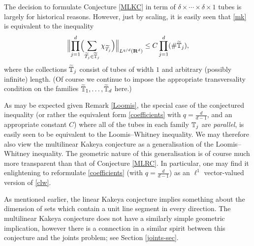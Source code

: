 \begin{remark}
The decision to formulate Conjecture \ref{MLKC} in term of
$\delta\times\cdots\times\delta\times 1$ tubes is largely for
historical reasons. However, just by scaling, it is easily seen
that \eqref{mk} is equivalent to the inequality
\begin{equation}\label{1tubes}
\Bigl\|\prod_{j=1}^{d}\Bigl(\sum_{\widetilde{T}_{j}\in\widetilde{{\mathbb{T}}}_{j}}
\chi_{\widetilde{T}_{j}}\Bigr)\Bigr\|_{L^{q/d}({\bf
R}^d)}\leq C\prod_{j=1}^{d}(\mbox{\#}\widetilde{{\mathbb{T}}}_{j}),
\end{equation}
where the collections $\widetilde{{\mathbb{T}}}_{j}$ consist of tubes of
width $1$ and arbitrary (possibly infinite) length. (Of course we
continue to impose the appropriate transversality condition on the
families $\widetilde{{\mathbb{T}}}_{1},\hdots,\widetilde{{\mathbb{T}}}_{d}$
here.)
\end{remark}

\begin{remark}
As may be expected given Remark \ref{Loomis}, the special case of
the conjectured inequality (or rather the equivalent form
\eqref{coefficients} with $q=\tfrac{d}{d-1}$, and an appropriate
constant $C$) where all of the
tubes in each family ${\mathbb{T}}_j$ are \textit{parallel}, is easily
seen to be equivalent to the
Loomis--Whitney inequality. We may therefore also view the
multilinear Kakeya conjecture as a generalisation of the
Loomis--Whitney inequality. The geometric nature of this
generalisation is of course much more transparent than that of
Conjecture \ref{MLRC}. In particular, one may find it enlightening
to reformulate \eqref{coefficients} (with $q=\tfrac{d}{d-1}$) as
an $\ell^1$ vector-valued version of \eqref{clw}.
\end{remark}

\begin{remark} As mentioned earlier, the linear Kakeya conjecture implies
something about the dimension of sets which contain a unit line segment in every
direction.  The multilinear Kakeya conjecture does not have a similarly simple geometric
implication, however there is a connection in a similar spirit between this conjecture and the joints problem;
see Section \ref{joints-sec}.
\end{remark}

